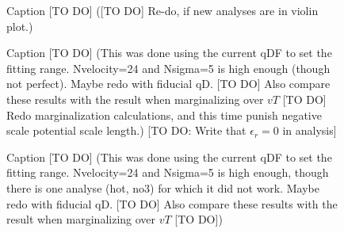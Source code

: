 

\begin{figure}
\caption{Caption [TO DO] ([TO DO] Re-do, if new analyses are in violin plot.)} 
\label{fig:incomp_mockdata}
\end{figure}


\begin{figure}
\caption{Caption [TO DO] (This was done using the current qDF to set the fitting range. Nvelocity=24 and Nsigma=5 is high enough (though not perfect). Maybe redo with fiducial qD. [TO DO] Also compare these results with the result when marginalizing over $vT$ [TO DO] Redo marginalization calculations, and this time punish negative scale potential scale length.) [TO DO: Write that $\epsilon_r = 0$ in analysis]} 
\label{fig:isoSphFlexIncompR_violins}
\end{figure}




\begin{figure}
\caption{Caption [TO DO] (This was done using the current qDF to set the fitting range. Nvelocity=24 and Nsigma=5 is high enough, though there is one analyse (hot, no3) for which it did not work. Maybe redo with fiducial qD. [TO DO] Also compare these results with the result when marginalizing over $vT$ [TO DO])} 
\label{fig:isoSphFlexIncompZ_violins}
\end{figure}


